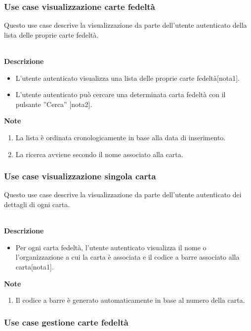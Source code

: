 \documentclass[a4paper,12pt]{article}
\begin{document}
\subsubsection*{Use case visualizzazione carte fedeltà}

Questo use case descrive la visualizzazione da parte dell'utente autenticato della lista delle proprie carte fedeltà.

\textbf{\\Descrizione}
\begin{itemize} \setlength\itemsep{0.01em}
\item L'utente autenticato visualizza una lista delle proprie carte fedeltà[nota1].
\item L'utente autenticato può cercare una determinata carta fedeltà con il pulsante ''Cerca'' [nota2].
\end{itemize}

\textbf{Note}
\begin{enumerate} \setlength\itemsep{0.01em}
\item La lista è ordinata cronologicamente in base alla data di inserimento.
\item La ricerca avviene secondo il nome associato alla carta.
\end{enumerate}




\subsubsection*{Use case visualizzazione singola carta}

Questo use case descrive la visualizzazione da parte dell'utente autenticato dei dettagli di ogni carta.

\textbf{\\Descrizione}
\begin{itemize} \setlength\itemsep{0.01em}
\item Per ogni carta fedeltà, l'utente autenticato visualizza il nome o l'organizzazione a cui la carta è associata e il codice a barre associato alla carta[nota1].
\end{itemize}

\textbf{Note}
\begin{enumerate} \setlength\itemsep{0.01em}
\item Il codice a barre è generato automaticamente in base al numero della carta.
\end{enumerate}


\subsubsection*{Use case gestione carte fedeltà}
\end{document}
